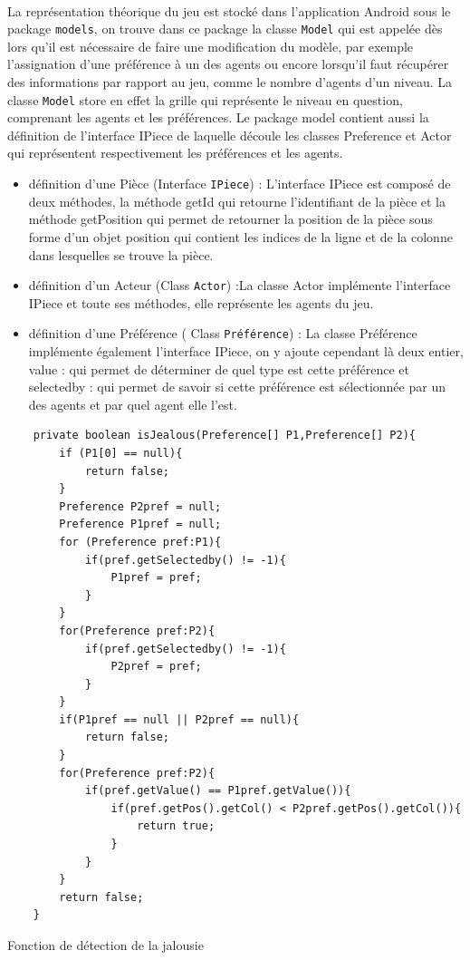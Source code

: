 \documentclass[a4paper, 11pt]{article}
\begin{document}
\paragraph{}
La représentation théorique du jeu est stocké dans l'application Android sous le package \texttt{models}, on trouve dans ce package la classe \texttt{Model} qui est appelée dès lors qu'il est nécessaire de faire une modification du modèle, par exemple l'assignation d'une préférence à un des agents ou encore lorsqu'il faut récupérer des informations par rapport au jeu, comme le nombre d'agents d'un niveau. La classe 
\texttt{Model} store en effet la grille qui représente le niveau en question, comprenant les agents et les préférences. Le package model contient aussi la définition de l’interface IPiece de laquelle découle les classes Preference et Actor qui représentent respectivement les préférences et les agents.
 \begin{itemize}
\item définition d'une Pièce (Interface \texttt{IPiece}) : L’interface IPiece est composé de deux méthodes, la méthode getId qui retourne l'identifiant de la pièce et la méthode getPosition qui permet de retourner la position de la pièce sous forme d’un objet position qui contient les indices de la ligne et de la colonne dans lesquelles se trouve la pièce.   
\item définition d’un Acteur (Class \texttt{Actor}) :La classe Actor implémente l'interface IPiece et toute ses méthodes, elle représente les agents du jeu.                                                                                                                                                                                                                                                                                                                                      
\item définition d’une Préférence ( Class \texttt{Préférence}) : La classe Préférence implémente également l’interface IPiece, on y ajoute cependant là deux entier, value : qui permet de déterminer de quel type est cette préférence et selectedby : qui permet de savoir si cette préférence est sélectionnée par un des agents et par quel agent elle l’est. 
\end{itemize}
\hfill \break
\begin{lstlisting}
    private boolean isJealous(Preference[] P1,Preference[] P2){
        if (P1[0] == null){
            return false;
        }
        Preference P2pref = null;
        Preference P1pref = null;
        for (Preference pref:P1){
            if(pref.getSelectedby() != -1){
                P1pref = pref;
            }
        }
        for(Preference pref:P2){
            if(pref.getSelectedby() != -1){
                P2pref = pref;
            }
        }
        if(P1pref == null || P2pref == null){
            return false;
        }
        for(Preference pref:P2){
            if(pref.getValue() == P1pref.getValue()){
                if(pref.getPos().getCol() < P2pref.getPos().getCol()){
                    return true;
                }
            }
        }
        return false;
    }
\end{lstlisting}
Fonction de détection de la jalousie 
\end{document}
